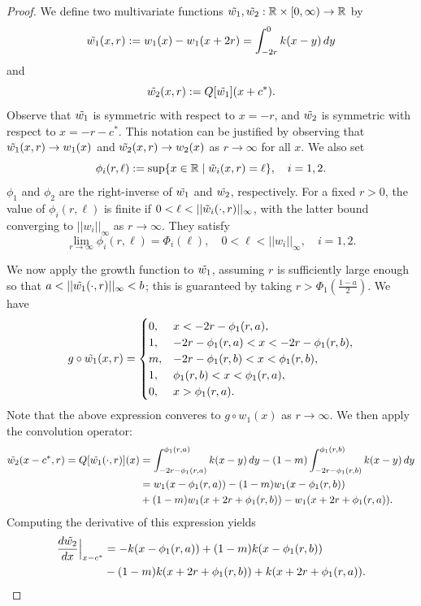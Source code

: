 \documentclass[11pt]{article}
\theoremstyle{definition}
\numberwithin{equation}{section}
\numberwithin{thm}{section}
\renewcommand{\a}{a}
\renewcommand{\b}{b}
\newcommand{\m}{m}
\begin{document}
\begin{proof}
We define two multivariate functions $\tilde{w_1},\tilde{w_2} : \mathbb R \times [0,\infty)\to\mathbb R$ by
\begin{equation}
\tilde{w_1}(x,r) := w_1(x) - w_1(x+2r) = \int_{-2r}^{0} k(x-y) \, dy
\end{equation}
and
\begin{equation}
\tilde{w_2}(x,r) := Q[\tilde{w_1}](x+c^*).
\end{equation}
Observe that $\tilde{w_1}$ is symmetric with respect to $x=-r$, and $\tilde{w_2}$ is symmetric with respect to $x=-r-c^*$. This notation can be justified by observing that $\tilde{w_1}(x,r) \to w_1(x)$ and $\tilde{w_2}(x,r)\to w_2(x)$ as $r\to\infty$ for all $x$. We also set
\begin{equation}
\phi_i(r,\ell) := \sup \{ x \in \mathbb R \mid \tilde{w}_i(x,r) = \ell \}, \quad i=1,2.
\end{equation}
$\phi_1$ and $\phi_2$ are the right-inverse of $\tilde{w_1}$ and $\tilde{w_2}$, respectively. For a fixed $r>0$, the value of $\phi_i(r,\ell)$ is finite if $0 < \ell < || \tilde{w}_i(\cdot, r) || _\infty$, with the latter bound converging to $||w_i||_\infty$ as $r\to\infty$. They satisfy
$$
\lim_{r\to\infty} \phi_i (r,\ell) = \Phi_i(\ell) , \quad 0 < \ell < || w_i ||_\infty, \quad i=1,2.
$$

We now apply the growth function to $\tilde{w_1}$, assuming $r$ is sufficiently large enough so that $\a < ||\what(\cdot,r)||_\infty < \b$; this is guaranteed by taking $r >  \Phi_1\left(\frac{1-a}{2}\right)$. We have
$$
g \circ \what(x,r)  = \begin{cases}
0, & x < -2r - \phi_1(r,a), \\
1, & -2r - \phi_1(r,a) < x < -2r - \phi_1(r,b), \\
\m, & -2r - \phi_1(r,b) < x < \phi_1(r,b),\\
1, & \phi_1(r,b) < x < \phi_1(r,a), \\
0, & x > \phi_1(r,a).
\end{cases} $$
Note that the above expression converes to $g \circ w_1(x)$ as $r\to\infty$. We then apply the convolution operator:
$$\begin{aligned} 
\whattwo(x-c^*,r) = Q[\what(\cdot,r)](x) &= \int_{-2r-\phi_1(r,a)}^{\phi_1(r,a)} k(x-y) \, dy - (1-\m) \int_{-2r-\phi_1(r,b)}^{\phi_1(r,b)} k(x-y) \, dy \\
&= w_1(x-\phi_1(r,a)) - (1-\m) w_1(x-\phi_1(r,b)) \\
&+ (1-\m) w_1(x+2r+\phi_1(r,b)) - w_1(x+2r+\phi_1(r,a)).
\end{aligned}$$
Computing the derivative of this expression yields
$$\begin{aligned} \label{qhatcomputation2}
\frac{d\whattwo}{dx}\Big|_{x-c^*} &= -k(x-\phi_1(r,a)) + (1-\m) k(x-\phi_1(r,b)) \\
& - (1-\m) k(x+2r+\phi_1(r,b)) + k(x+2r+\phi_1(r,a)).
\end{aligned}$$


\end{proof}
\end{document}
